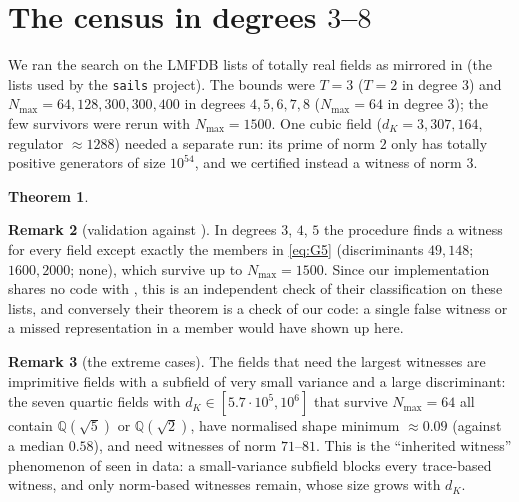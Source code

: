 \documentclass[11pt,reqno]{amsart}
\theoremstyle{plain}
\newtheorem{theorem}{Theorem}[section]
\theoremstyle{definition}
\newtheorem{remark}[theorem]{Remark}
\newcommand{\Q}{\mathbb{Q}}
\begin{document}
\section{The census in degrees $3$--$8$}\label{sec:census}

We ran the search on the LMFDB lists of totally real fields \cite{LMFDB} as mirrored in
\cite{Visser} (the lists used by the \texttt{sails} project). The bounds were $T=3$ ($T=2$ in degree
$3$) and $N_{\max}=64,128,300,300,400$ in degrees $4,5,6,7,8$ ($N_{\max}=64$ in degree $3$); the few
survivors were rerun with $N_{\max}=1500$. One cubic field ($d_K=3{,}307{,}164$, regulator $\approx1288$)
needed a separate run: its prime of norm $2$ only has totally positive generators of size $10^{54}$,
and we certified instead a witness of norm $3$.

\begin{theorem}\label{thm:census}

\end{theorem}

\begin{table}[t]
\caption{The census. U, T, N: number of fields whose first witness is a unit, a small-trace element,
or a small-norm generator. ``max $N$'' is the largest norm of a first witness of type N.}
\label{tab:census}

\end{table}

\begin{remark}[validation against \cite{KY}]
In degrees $3$, $4$, $5$ the procedure finds a witness for every field except exactly the members
in \eqref{eq:G5} (discriminants $49,148$; $1600,2000$; none), which survive up to $N_{\max}=1500$.
Since our implementation shares no code with \cite{KY}, this is an independent check of their
classification on these lists, and conversely their theorem is a check of our code: a single false
witness or a missed representation in a member would have shown up here.
\end{remark}

\begin{remark}[the extreme cases]
The fields that need the largest witnesses are imprimitive fields with a subfield of very small
variance and a large discriminant: the seven quartic fields with $d_K\in[5.7\cdot10^{5},10^{6}]$
that survive $N_{\max}=64$ all contain $\Q(\sqrt5)$ or $\Q(\sqrt2)$, have normalised shape minimum
$\approx0.09$ (against a median $0.58$), and need witnesses of norm $71$--$81$. This is the
``inherited witness'' phenomenon of \cite[``What remains, and why'']{PB} seen in data: a small-variance subfield blocks
every trace-based witness, and only norm-based witnesses remain, whose size grows with $d_K$.
\end{remark}
\end{document}
